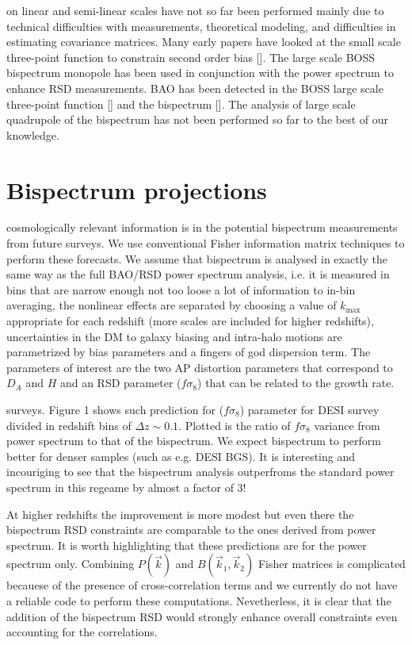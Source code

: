 on linear and semi-linear scales have not so far been performed mainly due to
technical difficulties with measurements, theoretical modeling, and
difficulties in estimating covariance matrices. Many early papers have looked
at the small scale three-point function to constrain second order bias []. The
large scale BOSS bispectrum monopole has been used in conjunction with the
power spectrum to enhance RSD measurements. BAO has been detected in the BOSS
large scale three-point function [] and the bispectrum []. The analysis of
large scale quadrupole of the bispectrum has not been performed so far to the
best of our knowledge.

\section{Bispectrum projections}

cosmologically relevant information is in the potential bispectrum measurements
from future surveys. We use conventional Fisher information matrix techniques
to perform these forecasts. We assume that bispectrum is analysed in exactly
the same way as the full BAO/RSD power spectrum analysis, i.e. it is measured
in bins that are narrow enough not too loose a lot of information to in-bin
averaging, the nonlinear effects are separated by choosing a value of
$k_\mathrm{max}$ appropriate for each redshift (more scales are included for
higher redshifts), uncertainties in the DM to galaxy biasing and intra-halo
motions are parametrized by bias parameters and a fingers of god dispersion
term. The parameters of interest are the two AP distortion parameters that
correspond to $D_A$ and $H$ and an RSD parameter ($f\sigma_8$) that can be
related to the growth rate.

surveys. Figure 1 shows such prediction for ($f\sigma_8$) parameter for DESI
survey divided in redshift bins of $\Delta z \sim 0.1$. Plotted is the ratio of
$f\sigma_8$ variance from power spectrum to that of the bispectrum. We expect
bispectrum to perform better for denser samples (such as e.g. DESI BGS). It is
interesting and incouriging to see that the bispectrum analysis outperfroms the
standard power spectrum in this regeame by almost a factor of 3!

At higher redshifts the improvement is more modest but even there the
bispectrum RSD constraints are comparable to the ones derived from power
spectrum. It is worth highlighting that these predictions are for the power
spectrum only. Combining $P(\vec{k})$ and $B(\vec{k}_1,\vec{k}_2)$ Fisher
matrices is complicated becauese of the presence of cross-correlation terms and
we currently do not have a reliable code to perform these computations.
Nevetherless, it is clear that the addition of the bispectrum RSD would
strongly enhance overall constraints even accounting for the correlations.

